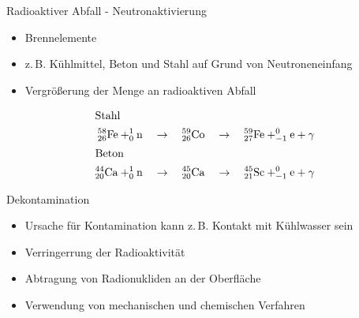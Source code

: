 \begin{frame}{Radioaktiver Abfall - Neutronaktivierung}

      \begin{itemize}
        \setlength\itemsep{1.2em}
        \item{Brennelemente}
        \item{z.\,B. Kühlmittel, Beton und Stahl auf Grund von Neutroneneinfang}
        \item{ Vergrößerung der Menge an radioaktiven Abfall}
      \end{itemize}
    
    \begin{align*}
        \shortintertext{Stahl}
        ^{58}_{26}\ce{Fe}+ ^1_0\mathrm{n }\quad &\rightarrow \quad  ^{59}_{26}\ce{Co} \quad \rightarrow \quad ^{59}_{27}\ce{Fe} + _{-1}^{0}\ce{e}+\gamma \\
      \shortintertext{Beton}
          ^{44}_{20}\ce{Ca}+ ^1_0\mathrm{n }\quad &\rightarrow \quad  ^{45}_{20}\ce{Ca} \quad \rightarrow \quad ^{45}_{21}\ce{Sc} + _{-1}^{0}\ce{e}+\gamma
    \end{align*}
        
\end{frame}



\begin{frame}{Dekontamination}
  \begin{itemize}
    \setlength\itemsep{1.2em}
     \item{ Ursache für Kontamination kann z.\,B. Kontakt mit Kühlwasser sein}
    \item{ Verringerrung der Radioaktivität}
    \item{ Abtragung von Radionukliden an der Oberfläche}
    \item{ Verwendung von mechanischen und chemischen Verfahren}
  \end{itemize}
\end{frame}


